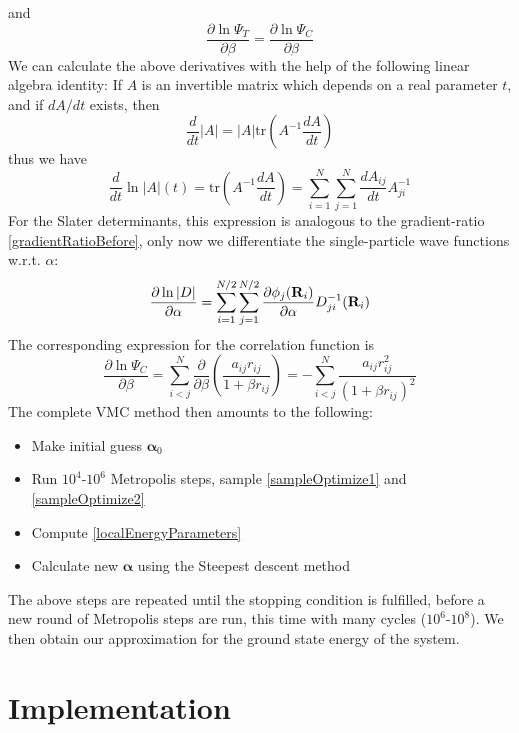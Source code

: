 \documentclass[english, a4paper]{article}
\begin{document}
and 
\begin{equation}
\frac{\partial\ln{\Psi_T}}{\partial \beta} = \frac{\partial\ln{\Psi_C}}{\partial \beta}
\end{equation}
We can calculate the above derivatives with the help of the following linear algebra identity:
If $A$ is an invertible matrix which depends on a real parameter $t$, and if $dA/dt$ exists, then
\begin{equation}
 \frac{d}{dt}|A| = |A|\textrm{tr}\left(A^{-1}\frac{dA}{dt}\right)
\end{equation}
thus we have
\begin{equation}
 \frac{d}{dt}\ln{|A|(t)} = \textrm{tr}\left(A^{-1}\frac{dA}{dt}\right) = 
 \sum_{i=1}^N\sum_{j=1}^N\frac{dA_{ij}}{dt}A_{ji}^{-1}
\end{equation}
For the Slater determinants, this expression is analogous to the gradient-ratio \eqref{gradientRatioBefore},
only now we differentiate the single-particle wave functions w.r.t. $\alpha$:
\begin{equation}
 \frac{\partial\ln{|D|}}{\partial \alpha} = 
 \sum_{i=1}^{N/2} \sum_{j=1}^{N/2} \frac{\partial \phi_j({\bf R}_i)}{\partial \alpha} D_{ji}^{-1}({\bf R}_i)
\end{equation}
The corresponding expression for the correlation function is
\begin{equation}
 \frac{\partial\ln{\Psi_C}}{\partial \beta} = 
 \sum_{i<j}^N \frac{\partial}{\partial\beta}
 \left(\frac{a_{ij}r_{ij}}{1 + \beta r_{ij}}\right) = 
 -\sum_{i<j}^N \frac{a_{ij}r_{ij}^2}{(1 + \beta r_{ij})^2}
\end{equation}
\noindent The complete VMC method then amounts to the following:
\begin{itemize}
 \item Make initial guess $\boldsymbol{\alpha}_0$
 \item Run $10^4$-$10^6$ Metropolis steps, sample \eqref{sampleOptimize1} and \eqref{sampleOptimize2}
 \item Compute \eqref{localEnergyParameters} 
 \item Calculate new $\boldsymbol{\alpha}$ using the Steepest descent method
\end{itemize}
The above steps are repeated until the stopping condition is fulfilled, before a new round of
Metropolis steps are run, this time with many cycles ($10^6$-$10^8$). We then obtain our approximation
for the ground state energy of the system.


\section{Implementation}
\end{document}

